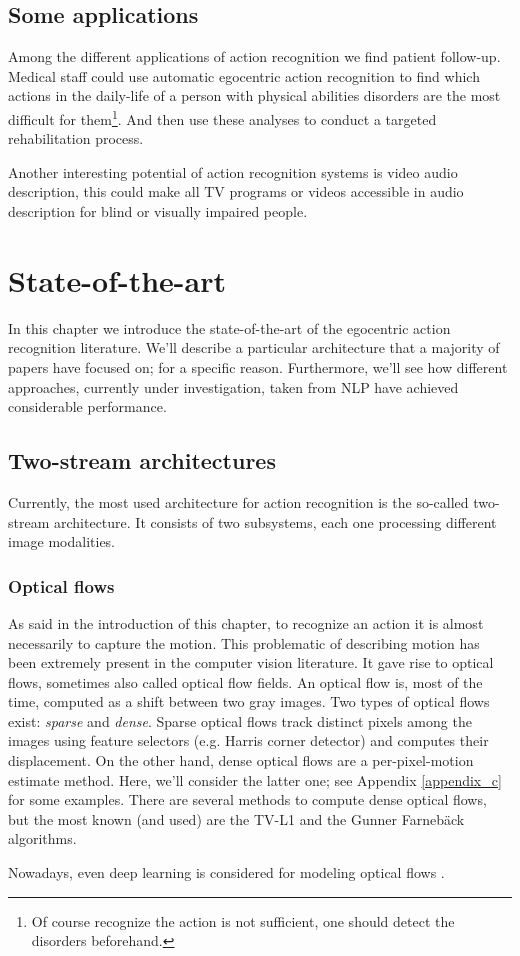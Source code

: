 \documentclass[12pt, a4paper]{report}
\begin{document}
				\subsection*{Some applications}
					Among the different applications of action recognition we find patient follow-up.
					Medical staff could use automatic egocentric action recognition to find which actions in the daily-life of a person with physical abilities disorders are the most difficult for them\footnote{Of course recognize the action is not sufficient, one should detect the disorders beforehand.}.
					And then use these analyses to conduct a targeted rehabilitation process.
					\par
					Another interesting potential of action recognition systems is video audio description, this could make all TV programs or videos accessible in audio description for blind or visually impaired people.
		\section{State-of-the-art}
			In this chapter we introduce the state-of-the-art of the egocentric action recognition literature.
			We'll describe a particular architecture that a majority of papers have focused on; for a specific reason.
			Furthermore, we'll see how different approaches, currently under investigation, taken from NLP have achieved considerable performance.
			\subsection{Two-stream architectures}\label{twostream}
				Currently, the most used architecture for action recognition is the so-called two-stream architecture.
				It consists of two subsystems, each one processing different image modalities.
				\subsubsection{Optical flows}
					As said in the introduction of this chapter, to recognize an action it is almost necessarily to capture the motion.
					This problematic of describing motion has been extremely present in the computer vision literature.
					It gave rise to optical flows, sometimes also called optical flow fields.
					An optical flow is, most of the time, computed as a shift between two gray images.
					Two types of optical flows exist: {\itshape sparse} and {\itshape dense}.
					Sparse optical flows track distinct pixels among the images using feature selectors (e.g. Harris corner detector) and computes their displacement.
					On the other hand, dense optical flows are a per-pixel-motion estimate method.
					Here, we'll consider the latter one; see Appendix \ref{appendix_c} for some examples.
					There are several methods to compute dense optical flows, but the most known (and used) are the TV-L1 \cite{perez2013tv} and the Gunner Farnebäck \cite{farneback2003two} algorithms.
					\par
					Nowadays, even deep learning is considered for modeling optical flows \cite{hur2020optical}.
\end{document}
